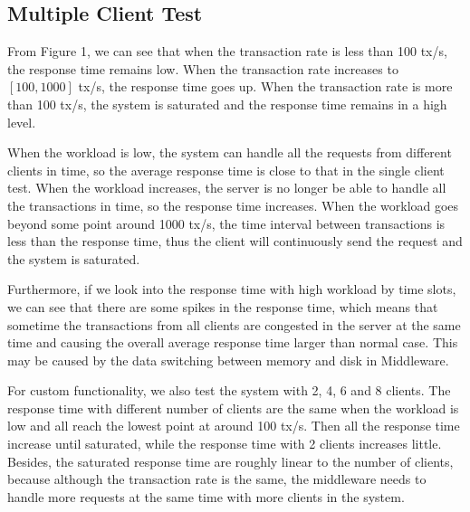 \documentclass[a4paper, 11pt]{article}
\begin{document}
\subsection{Multiple Client Test}
\vspace{-10pt}
      From Figure 1, we can see that when the transaction rate is less than 100 tx/s, the response time remains low. When the transaction rate increases to $[100, 1000]$ tx/s, the response time goes up. When the transaction rate is more than 100 tx/s, the system is saturated and the response time remains in a high level. \par
      When the workload is low, the system can handle all the requests from different clients in time, so the average response time is close to that in the single client test. When the workload increases, the server is no longer be able to handle all the transactions in time, so the response time increases. When the workload goes beyond some point around 1000 tx/s, the time interval between transactions is less than the response time, thus the client will continuously send the request and the system is saturated. \par
      Furthermore, if we look into the response time with high workload by time slots, we can see that there are some spikes in the response time, which means that sometime the transactions from all clients are congested in the server at the same time and causing the overall average response time larger than normal case. This may be caused by the data switching between memory and disk in Middleware. \par
      For custom functionality, we also test the system with 2, 4, 6 and 8 clients. The response time with different number of clients are the same when the workload is low and all reach the lowest point at around 100 tx/s. Then all the response time increase until saturated, while the response time with 2 clients increases little. Besides, the saturated response time are roughly linear to the number of clients, because although the transaction rate is the same, the middleware needs to handle more requests at the same time with more clients in the system.
\end{document}
